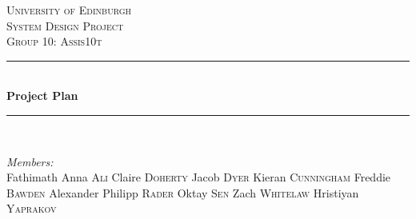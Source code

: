\documentclass[12pt]{article}
\begin{document}
\begin{titlepage}

\newcommand{\HRule}{\rule{\linewidth}{0.5mm}} 

\center %
 


\hspace{2.5cm}\textsc{\LARGE University of Edinburgh}\\[1.5cm] %
\textsc{\Large System Design Project}\\[0.5cm] %
\textsc{\large Group 10: Assis10t}\\[0.5cm] %


\HRule \\[0.4cm]
{ \huge \bfseries Project Plan}\\[0.4cm] %
\HRule \\[1.5cm]
 
\begin{minipage}{0.45\textwidth}
\begin{flushleft} \large
\emph{Members:}\\
Fathimath Anna \textsc{Ali}
\newline Claire \textsc{Doherty}
\newline Jacob \textsc{Dyer}
\newline Kieran \textsc{Cunningham}
\newline Freddie \textsc{Bawden}
\newline Alexander Philipp \textsc{Rader}
\newline Oktay \textsc{Sen}
\newline Zach \textsc{Whitelaw}
\newline Hristiyan \textsc{Yaprakov}


\end{flushleft}
\end{minipage}
\end{titlepage}
\end{document}
